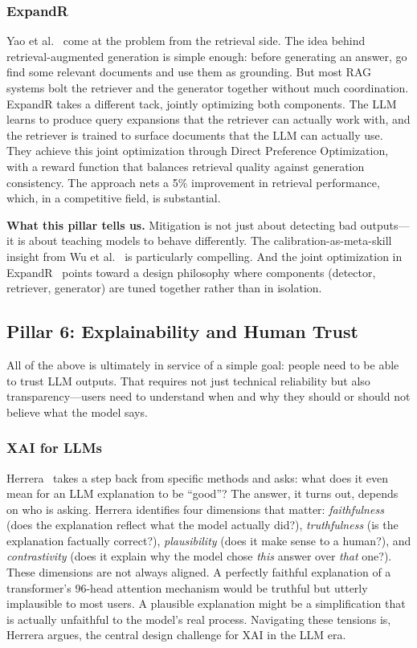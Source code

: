 \documentclass[journal]{IEEEtran}
\begin{document}
\subsubsection{ExpandR}
Yao et al.~\cite{expandr} come at the problem from the retrieval side. The idea behind retrieval-augmented generation is simple enough: before generating an answer, go find some relevant documents and use them as grounding. But most RAG systems bolt the retriever and the generator together without much coordination. ExpandR takes a different tack, jointly optimizing both components. The LLM learns to produce query expansions that the retriever can actually work with, and the retriever is trained to surface documents that the LLM can actually use. They achieve this joint optimization through Direct Preference Optimization, with a reward function that balances retrieval quality against generation consistency. The approach nets a 5\% improvement in retrieval performance, which, in a competitive field, is substantial.

\textbf{What this pillar tells us.} Mitigation is not just about detecting bad outputs---it is about teaching models to behave differently. The calibration-as-meta-skill insight from Wu et al.~\cite{calibrated_rl} is particularly compelling. And the joint optimization in ExpandR~\cite{expandr} points toward a design philosophy where components (detector, retriever, generator) are tuned together rather than in isolation.

\subsection{Pillar 6: Explainability and Human Trust}

All of the above is ultimately in service of a simple goal: people need to be able to trust LLM outputs. That requires not just technical reliability but also transparency---users need to understand when and why they should or should not believe what the model says.

\subsubsection{XAI for LLMs}
Herrera~\cite{xai_survey} takes a step back from specific methods and asks: what does it even mean for an LLM explanation to be ``good''? The answer, it turns out, depends on who is asking. Herrera identifies four dimensions that matter: \emph{faithfulness} (does the explanation reflect what the model actually did?), \emph{truthfulness} (is the explanation factually correct?), \emph{plausibility} (does it make sense to a human?), and \emph{contrastivity} (does it explain why the model chose \emph{this} answer over \emph{that} one?). These dimensions are not always aligned. A perfectly faithful explanation of a transformer's 96-head attention mechanism would be truthful but utterly implausible to most users. A plausible explanation might be a simplification that is actually unfaithful to the model's real process. Navigating these tensions is, Herrera argues, the central design challenge for XAI in the LLM era.
\end{document}
